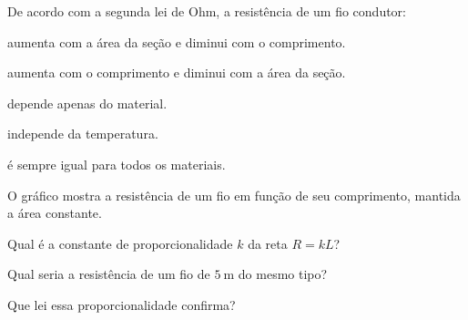 \blocofixacao
\begin{questao}[1]{}

De acordo com a segunda lei de Ohm, a resistência de um fio condutor:
\begin{alternativas}
\item aumenta com a área da seção e diminui com o comprimento.
\item aumenta com o comprimento e diminui com a área da seção.
\item depende apenas do material.
\item independe da temperatura.
\item é sempre igual para todos os materiais.
\end{alternativas}


\end{questao}
\begin{questao}[1]{}

O gráfico mostra a resistência de um fio em função de seu comprimento, mantida a
área constante.


\begin{itensq}
\item Qual é a constante de proporcionalidade $k$ da reta $R = kL$?
\item Qual seria a resistência de um fio de $\SI{5}{\meter}$ do mesmo tipo?
\item Que lei essa proporcionalidade confirma?
\end{itensq}


\end{questao}

